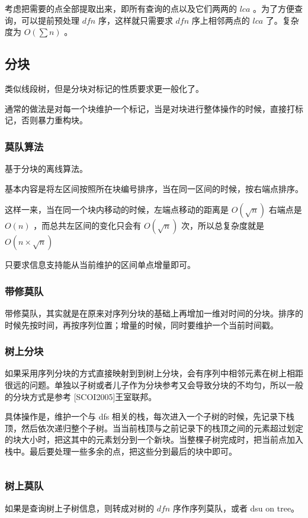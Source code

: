 \documentclass[UTF-8]{ctexart}
\newcommand{\cpp}[1]{\inputminted[bgcolor=bg,breaklines,breakanywhere=true]{c++}{#1}}
\begin{document}
		考虑把需要的点全部提取出来，即所有查询的点以及它们两两的 $lca$ 。为了方便查询，可以提前预处理 $dfn$ 序，这样就只需要求 $dfn$ 序上相邻两点的 $lca$ 了。复杂度为 $O(\sum n)$ 。
		\subsection{分块}
		类似线段树，但是分块对标记的性质要求更一般化了。
		
		通常的做法是对每一个块维护一个标记，当是对块进行整体操作的时候，直接打标记，否则暴力重构块。
			\subsubsection{莫队算法}
			基于分块的离线算法。
			
			基本内容是将左区间按照所在块编号排序，当在同一区间的时候，按右端点排序。
			
			这样一来，当在同一个块内移动的时候，左端点移动的距离是 $O(\sqrt{n})$ 右端点是 $O(n)$ ，而总共左区间的变化只会有 $O(\sqrt{n})$ 次，所以总复杂度就是 $O(n \times \sqrt{n})$
			
			只要求信息支持能从当前维护的区间单点增量即可。
			\subsubsection{带修莫队}
			带修莫队，其实就是在原来对序列分块的基础上再增加一维对时间的分块。排序的时候先按时间，再按序列位置；增量的时候，同时要维护一个当前时间戳。
			
			\subsubsection{树上分块}
			如果采用序列分块的方式直接映射到到树上分块，会有序列中相邻元素在树上相距很远的问题。单独以子树或者儿子作为分块参考又会导致分块的不均匀，所以一般的分块方式是参考 [SCOI2005]王室联邦。
			
			具体操作是，维护一个与 dfs 相关的栈，每次进入一个子树的时候，先记录下栈顶，然后依次递归整个子树。当当前栈顶与之前记录下的栈顶之间的元素超过划定的块大小时，把这其中的元素划分到一个新块。当整棵子树完成时，把当前点加入栈中。最后要处理一些多余的点，把这些分到最后的块中即可。
			\cpp{code//DataStruct//blocktree.cpp}
			
			\subsubsection{树上莫队}
			如果是查询树上子树信息，则转成对树的 $dfn$ 序作序列莫队，或者 dsu on tree。
			
\end{document}

